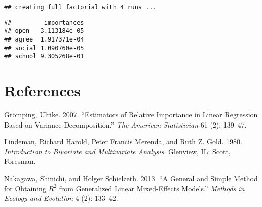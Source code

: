 \documentclass[
]{article}
\begin{document}
\begin{verbatim}
## creating full factorial with 4 runs ...
\end{verbatim}

\begin{verbatim}
##         importances
## open   3.113184e-05
## agree  1.917371e-04
## social 1.090760e-05
## school 9.305268e-01
\end{verbatim}

\hypertarget{references}{%
\section*{References}\label{references}}

\hypertarget{refs}{}
\leavevmode\hypertarget{ref-statPractice2007}{}%
Grömping, Ulrike. 2007. ``Estimators of Relative Importance in Linear
Regression Based on Variance Decomposition.'' \emph{The American
Statistician} 61 (2): 139--47.

\leavevmode\hypertarget{ref-lindeman1980introduction}{}%
Lindeman, Richard Harold, Peter Francis Merenda, and Ruth Z. Gold. 1980.
\emph{Introduction to Bivariate and Multivariate Analysis}. Glenview,
IL: Scott, Foresman.

\leavevmode\hypertarget{ref-nakagawa2013}{}%
Nakagawa, Shinichi, and Holger Schielzeth. 2013. ``A General and Simple
Method for Obtaining \(R^2\) from Generalized Linear Mixed-Effects
Models.'' \emph{Methods in Ecology and Evolution} 4 (2): 133--42.
\end{document}
